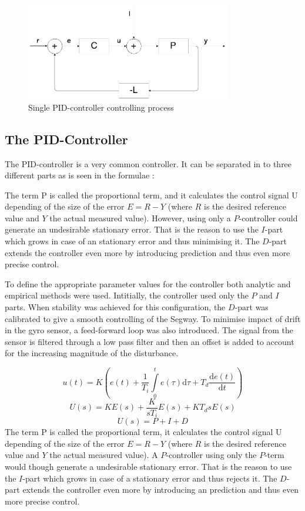 \begin{figure}[h]
    \label{1}
    \centering
    \includegraphics[width=0.8\textwidth]{process_one_regul.png}
    \caption{Single PID-controller controlling process}
\end{figure}
\subsection{The PID-Controller}


The PID-controller is a very common controller. It can be separated in to three different parts as is seen in the formulae \cite{PID}:

The term P is called the proportional term, and it calculates the control signal U depending of the size of the error $E = R - Y$ (where $R$ is the desired reference value and $Y$ the actual measured value). However, using only a $P$-controller could generate an undesirable stationary error. That is the reason to use the $I$-part which grows in case of an stationary error and thus minimising it. The $D$-part extends the controller even more by introducing prediction and thus even more precise control.

To define the appropriate parameter values for the controller both analytic and empirical methods were used. Intitially, the controller used only the $P$ and $I$ parts. When stability was achieved for this configuration, the $D$-part was calibrated to give a smooth controlling of the Segway. To minimise impact of drift in the gyro sensor, a feed-forward loop was also introduced. The signal from the sensor is filtered through a low pass filter and then an offset is added to account for the increasing magnitude of the disturbance.

\begin{equation}
   u(t) = K(e(t) + \frac{1}{T_i}\int\limits_0^t e(\tau) \mathrm{d}\tau + T_d\frac{\mathrm d e(t)}{\mathrm d t})
\end{equation}
\begin{equation}
   U(s) = KE(s) +  \frac{K}{sT_i}E(s) + KT_d s E(s)
\end{equation}
\begin{equation}
   U(s) = P +  I + D
\end{equation}
The term P is called the proportional term, it calculates the control signal U depending of the size of the error $E = R - Y$ (where $R$ is the desired reference value and $Y$ the actual measured value). A $P$-controller using only the $P$-term would though generate a undesirable stationary error. That is the reason to use the $I$-part which grows in case of a stationary error and thus rejects it. The $D$-part extends the controller even more by introducing an prediction and thus even more precise control.

